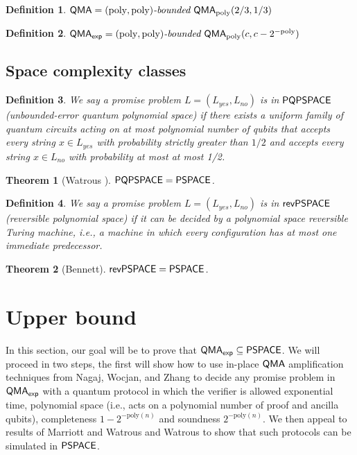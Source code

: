 \documentclass[11pt]{article}
\newtheorem{theorem}{Theorem}
\newtheorem{definition}{Definition}
\theoremstyle{definition}
\theoremstyle{remark}
\newcommand\QMA{{\sf{QMA}}}
\newcommand\PSPACE{{\sf{PSPACE}}}
\newcommand\QMAexp{{\sf{QMA}_{exp}}}
\newcommand\bddQMA[5]{{\left(#1,#2\right)}\textit{-bounded }\QMA_{#3}(#4,#5)}
\newcommand\PQPSPACE{{\sf{PQPSPACE}}}
\newcommand\revPSPACE{{\sf{revPSPACE}}}
\newcommand{\poly}{\textrm{poly}}
\begin{document}
\begin{definition} $\QMA=\bddQMA{\poly}{\poly}{\poly}{2/3}{1/3}$\end{definition}
\begin{definition} $\QMAexp=\bddQMA{\poly}{\poly}{\poly}{c}{c-2^{-\poly}}$	
\end{definition}

\subsection{Space complexity classes}
\begin{definition}We say a promise problem $L=(L_{yes},L_{no})$ is in $\PQPSPACE$ (unbounded-error quantum polynomial space) if there exists a uniform family of quantum circuits acting on at most polynomial number of qubits that accepts every string $x\in L_{yes}$ with probability strictly greater than $1/2$ and accepts every string $x \in L_{no}$ with probability at most at most 1/2.
	
\end{definition}
\begin{theorem}[Watrous \cite{Watrous99}]\label{thm:pqpspace} $\PQPSPACE=\PSPACE$.	
\end{theorem}

\begin{definition}We say a promise problem $L=(L_{yes},L_{no})$ is in $\revPSPACE$ (reversible polynomial space) if it can be decided by a polynomial space reversible Turing machine, i.e., a machine in which every configuration has at most one immediate predecessor.  	
\end{definition}

\begin{theorem}[Bennett\cite{bennett89}]\label{thm:revpspace}$\revPSPACE=\PSPACE$.
\end{theorem}

\section{Upper bound}
In this section, our goal will be to prove that $\QMAexp\subseteq\PSPACE$.  We will proceed in two steps, the first will show how to use in-place $\QMA$ amplification techniques from Nagaj, Wocjan, and Zhang \cite{nwz11} to decide any promise problem in $\QMAexp$ with a quantum protocol in which the verifier is allowed exponential time, polynomial space (i.e., acts on a polynomial number of proof and ancilla qubits), completeness $1-2^{-\poly(n)}$ and soundness $2^{-\poly(n)}$.  We then appeal to results of Marriott and Watrous \cite{mw05} and  Watrous \cite{Watrous99} to show that such protocols can be simulated in $\PSPACE$.
\end{document}
